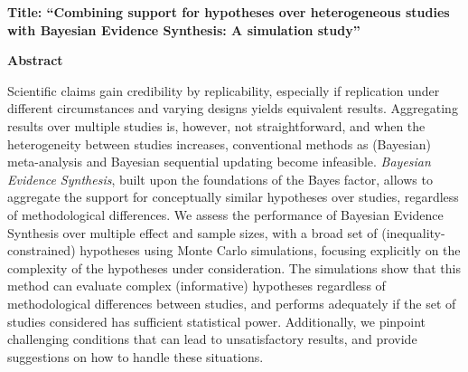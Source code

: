 \documentclass[
]{interact}
\begin{document}
\ifdefined\Shaded\renewenvironment{Shaded}{\begin{tcolorbox}[borderline west={3pt}{0pt}{shadecolor}, boxrule=0pt, frame hidden, enhanced, breakable, sharp corners, interior hidden]}{\end{tcolorbox}}\fi

\doublespacing
{}

% 
% 
% 
% 

\textbf{Title: ``Combining support for hypotheses over heterogeneous
studies with Bayesian Evidence Synthesis: A simulation study''}

\textbf{Abstract}

Scientific claims gain credibility by replicability, especially if
replication under different circumstances and varying designs yields
equivalent results. Aggregating results over multiple studies is,
however, not straightforward, and when the heterogeneity between studies
increases, conventional methods as (Bayesian) meta-analysis and Bayesian
sequential updating become infeasible. \emph{Bayesian Evidence
Synthesis}, built upon the foundations of the Bayes factor, allows to
aggregate the support for conceptually similar hypotheses over studies,
regardless of methodological differences. We assess the performance of
Bayesian Evidence Synthesis over multiple effect and sample sizes, with
a broad set of (inequality-constrained) hypotheses using Monte Carlo
simulations, focusing explicitly on the complexity of the hypotheses
under consideration. The simulations show that this method can evaluate
complex (informative) hypotheses regardless of methodological
differences between studies, and performs adequately if the set of
studies considered has sufficient statistical power. Additionally, we
pinpoint challenging conditions that can lead to unsatisfactory results,
and provide suggestions on how to handle these situations.
\end{document}
